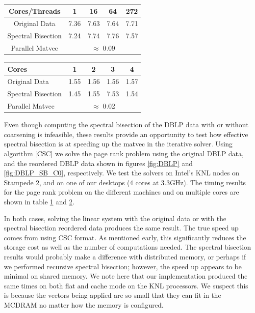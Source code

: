 \documentclass[11pt]{article}
\begin{document}
\begin{table}[h!]
	\centering
	\begin{tabular}[h]{|c||c|c|c|c|}
		\hline
		Cores/Threads& 1 & 16 & 64 & 272 \\
		\hline
		Original Data & 7.36 & 7.63 & 7.64 & 7.71\\
		Spectral Bisection & 7.24 & 7.74 & 7.76 & 7.57 \\
		\hline
		Parallel Matvec & \multicolumn{4}{|c|}{$\approx$ 0.09}\\
		\hline
	\end{tabular}
\label{tab:KNLTIME}
\end{table}

\begin{table}[h!]
	\centering
	\begin{tabular}[h]{|l||c|c|c|c|}
		\hline
		Cores & 1 & 2& 3 & 4 \\
		\hline
		Original Data & 1.55 & 1.56 & 1.56 & 1.57\\
		Spectral Bisection & 1.45 & 1.55 & 7.53 & 1.54 \\
		\hline
		Parallel Matvec & \multicolumn{4}{|c|}{$\approx$ 0.02}\\
		\hline
	\end{tabular}
\label{tab:ICESTIME}
\end{table}

Even though computing the spectral bisection of the DBLP data with or without
coarsening is infeasible, these results provide an opportunity to test how
effective spectral bisection is at speeding up the matvec in the iterative
solver. Using algorithm
\ref{CSC} we solve the page rank problem using the original DBLP data, and the
reordered DBLP data shown in figures \ref{fig:DBLP} and \ref{fig:DBLP_SB_C0},
respectively. We test the solvers on Intel's KNL nodes on Stampede 2, and on one
of our desktops (4 cores at 3.3GHz). The timing results for the page rank
problem on the different
machines and on multiple cores are shown in table \ref{tab:KNLTIME} and
\ref{tab:ICESTIME}.

In both cases, solving the linear system with the original data
or with the spectral bisection reordered data produces the same result. The true
speed up comes from using CSC format. As mentioned early, this significantly
reduces the storage cost as well as the number of computations needed. The
spectral bisection results would probably make a difference with distributed
memory, or perhaps if we performed recursive spectral bisection; however, the
speed up appears to be minimal on shared memory. We note here that our
implementation produced the same times on both flat and cache mode on the KNL
processors. We suspect this is because the vectors being applied are so small
that they can fit in the MCDRAM no matter how the memory is configured.
\end{document}
